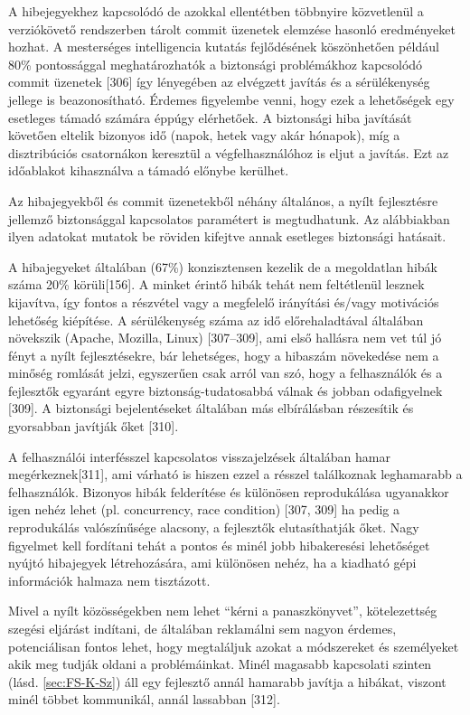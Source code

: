 \documentclass[12pt,magyar,a4paper,oneside]{scrreprt}
\begin{document}
A hibejegyekhez kapcsolódó de azokkal ellentétben többnyire közvetlenül
a verziókövető rendszerben tárolt commit üzenetek elemzése hasonló
eredményeket hozhat. A mesterséges intelligencia kutatás fejlődésének
köszönhetően például 80\% pontossággal meghatározhatók a biztonsági
problémákhoz kapcsolódó commit üzenetek {[}306{]} így lényegében az
elvégzett javítás és a sérülékenység jellege is beazonosítható. Érdemes
figyelembe venni, hogy ezek a lehetőségek egy esetleges támadó számára
éppúgy elérhetőek. A biztonsági hiba javítását követően eltelik bizonyos
idő (napok, hetek vagy akár hónapok), míg a disztribúciós csatornákon
keresztül a végfelhasználóhoz is eljut a javítás. Ezt az időablakot
kihasználva a támadó előnybe kerülhet.

Az hibajegyekből és commit üzenetekből néhány általános, a nyílt
fejlesztésre jellemző biztonsággal kapcsolatos paramétert is
megtudhatunk. Az alábbiakban ilyen adatokat mutatok be röviden kifejtve
annak esetleges biztonsági hatásait.

A hibajegyeket általában (67\%) konzisztensen kezelik de a megoldatlan
hibák száma 20\% körüli{[}156{]}. A minket érintő hibák tehát nem
feltétlenül lesznek kijavítva, így fontos a részvétel vagy a megfelelő
irányítási és/vagy motivációs lehetőség kiépítése. A sérülékenység száma
az idő előrehaladtával általában növekszik (Apache, Mozilla, Linux)
{[}307--309{]}, ami első hallásra nem vet túl jó fényt a nyílt
fejlesztésekre, bár lehetséges, hogy a hibaszám növekedése nem a minőség
romlását jelzi, egyszerűen csak arról van szó, hogy a felhasználók és a
fejlesztők egyaránt egyre biztonság-tudatosabbá válnak és jobban
odafigyelnek {[}309{]}. A biztonsági bejelentéseket általában más
elbírálásban részesítik és gyorsabban javítják őket {[}310{]}.

A felhasználói interfésszel kapcsolatos visszajelzések általában hamar
megérkeznek{[}311{]}, ami várható is hiszen ezzel a résszel találkoznak
leghamarabb a felhasználók. Bizonyos hibák felderítése és különösen
reprodukálása ugyanakkor igen nehéz lehet (pl. concurrency, race
condition) {[}307, 309{]} ha pedig a reprodukálás valószínűsége
alacsony, a fejlesztők elutasíthatják őket. Nagy figyelmet kell
fordítani tehát a pontos és minél jobb hibakeresési lehetőséget nyújtó
hibajegyek létrehozására, ami különösen nehéz, ha a kiadható gépi
információk halmaza nem tisztázott.

Mivel a nyílt közösségekben nem lehet ``kérni a panaszkönyvet'',
kötelezettség szegési eljárást indítani, de általában reklamálni sem
nagyon érdemes, potenciálisan fontos lehet, hogy megtaláljuk azokat a
módszereket és személyeket akik meg tudják oldani a problémáinkat. Minél
magasabb kapcsolati szinten (lásd. \ref{sec:FS-K-Sz}) áll egy fejlesztő
annál hamarabb javítja a hibákat, viszont minél többet kommunikál, annál
lassabban {[}312{]}.
\end{document}
